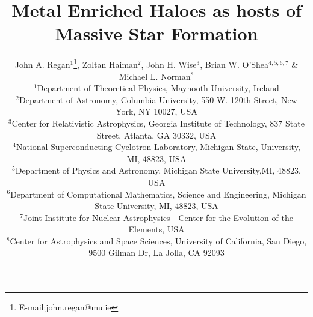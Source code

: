 \documentclass[graphics, twocolumn, usenatbib]{mn2e}
\begin{document}
\title{Metal Enriched Haloes as hosts of Massive Star Formation}
\author[J. A. Regan, Z. Haiman, J. H. Wise, B.W. O'Shea \&  M.L. Norman]{John A. Regan$^{1}$\thanks{E-mail:john.regan@mu.ie}, Zoltan Haiman$^{2}$,
  John H. Wise$^{3}$, Brian W. O'Shea$^{4,5,6,7}$ \newauthor \& Michael L. Norman$^8$\\
  $^1$Department of Theoretical Physics, Maynooth University, Ireland\\
  $^2$Department of Astronomy, Columbia University, 550 W. 120th Street, New York, NY 10027, USA\\
  $^3$Center for Relativistic Astrophysics, Georgia Institute of Technology, 837 State Street, Atlanta, GA 30332, USA\\
  $^4$National Superconducting Cyclotron Laboratory, Michigan State, University, MI, 48823, USA\\
  $^5$Department of Physics and Astronomy, Michigan State University,MI, 48823, USA\\
  $^6$Department of Computational Mathematics, Science and Engineering, Michigan State University, MI, 48823, USA\\    
  $^7$Joint Institute for Nuclear Astrophysics - Center for the Evolution of the Elements, USA\\
  $^8$Center for Astrophysics and Space Sciences, University of California, San Diego, 9500 Gilman Dr, La Jolla, CA 92093\\}

\label{firstpage}
\pagerange{\pageref{firstpage}--\pageref{lastpage}}
\maketitle
\end{document}
